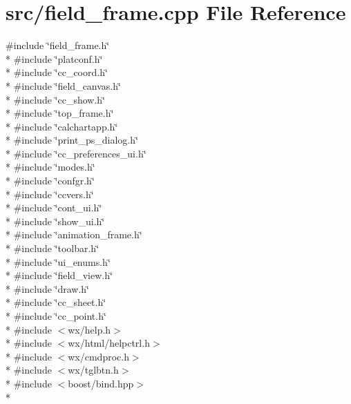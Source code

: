 \hypertarget{a00226}{\section{src/field\-\_\-frame.cpp File Reference}
\label{a00226}
}
{\ttfamily \#include \char`\"{}field\-\_\-frame.\-h\char`\"{}}\\*
{\ttfamily \#include \char`\"{}platconf.\-h\char`\"{}}\\*
{\ttfamily \#include \char`\"{}cc\-\_\-coord.\-h\char`\"{}}\\*
{\ttfamily \#include \char`\"{}field\-\_\-canvas.\-h\char`\"{}}\\*
{\ttfamily \#include \char`\"{}cc\-\_\-show.\-h\char`\"{}}\\*
{\ttfamily \#include \char`\"{}top\-\_\-frame.\-h\char`\"{}}\\*
{\ttfamily \#include \char`\"{}calchartapp.\-h\char`\"{}}\\*
{\ttfamily \#include \char`\"{}print\-\_\-ps\-\_\-dialog.\-h\char`\"{}}\\*
{\ttfamily \#include \char`\"{}cc\-\_\-preferences\-\_\-ui.\-h\char`\"{}}\\*
{\ttfamily \#include \char`\"{}modes.\-h\char`\"{}}\\*
{\ttfamily \#include \char`\"{}confgr.\-h\char`\"{}}\\*
{\ttfamily \#include \char`\"{}ccvers.\-h\char`\"{}}\\*
{\ttfamily \#include \char`\"{}cont\-\_\-ui.\-h\char`\"{}}\\*
{\ttfamily \#include \char`\"{}show\-\_\-ui.\-h\char`\"{}}\\*
{\ttfamily \#include \char`\"{}animation\-\_\-frame.\-h\char`\"{}}\\*
{\ttfamily \#include \char`\"{}toolbar.\-h\char`\"{}}\\*
{\ttfamily \#include \char`\"{}ui\-\_\-enums.\-h\char`\"{}}\\*
{\ttfamily \#include \char`\"{}field\-\_\-view.\-h\char`\"{}}\\*
{\ttfamily \#include \char`\"{}draw.\-h\char`\"{}}\\*
{\ttfamily \#include \char`\"{}cc\-\_\-sheet.\-h\char`\"{}}\\*
{\ttfamily \#include \char`\"{}cc\-\_\-point.\-h\char`\"{}}\\*
{\ttfamily \#include $<$wx/help.\-h$>$}\\*
{\ttfamily \#include $<$wx/html/helpctrl.\-h$>$}\\*
{\ttfamily \#include $<$wx/cmdproc.\-h$>$}\\*
{\ttfamily \#include $<$wx/tglbtn.\-h$>$}\\*
{\ttfamily \#include $<$boost/bind.\-hpp$>$}\\*
